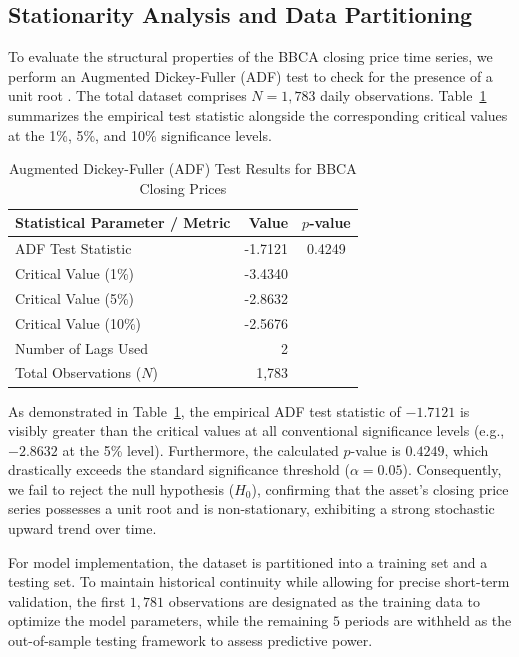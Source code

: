 \documentclass[11pt,twoside]{article}
\begin{document}
\subsection{Stationarity Analysis and Data Partitioning}
\label{SubSec:Stationarity}

To evaluate the structural properties of the BBCA closing price time series, we perform an Augmented Dickey-Fuller (ADF) test to check for the presence of a unit root \cite{Dickey1979}. The total dataset comprises $N = 1,783$ daily observations. Table~\ref{Tab:ADF_Results} summarizes the empirical test statistic alongside the corresponding critical values at the 1\%, 5\%, and 10\% significance levels.

\begin{table}[ht]
\centering
\caption{Augmented Dickey-Fuller (ADF) Test Results for BBCA Closing Prices}
\label{Tab:ADF_Results}
\begin{tabular}{lrc}
\hline
Statistical Parameter / Metric & Value & $p$-value \\
\hline
ADF Test Statistic & -1.7121 & 0.4249 \\
Critical Value (1\%) & -3.4340 & \\
Critical Value (5\%) & -2.8632 & \\
Critical Value (10\%) & -2.5676 & \\
Number of Lags Used & 2 & \\
Total Observations ($N$) & 1,783 & \\
\hline
\end{tabular}
\end{table}

As demonstrated in Table~\ref{Tab:ADF_Results}, the empirical ADF test statistic of $-1.7121$ is visibly greater than the critical values at all conventional significance levels (e.g., $-2.8632$ at the 5\% level). Furthermore, the calculated $p$-value is $0.4249$, which drastically exceeds the standard significance threshold ($\alpha = 0.05$). Consequently, we fail to reject the null hypothesis ($H_0$), confirming that the asset's closing price series possesses a unit root and is non-stationary, exhibiting a strong stochastic upward trend over time.

For model implementation, the dataset is partitioned into a training set and a testing set. To maintain historical continuity while allowing for precise short-term validation, the first $1,781$ observations are designated as the training data to optimize the model parameters, while the remaining $5$ periods are withheld as the out-of-sample testing framework to assess predictive power.
\end{document}

